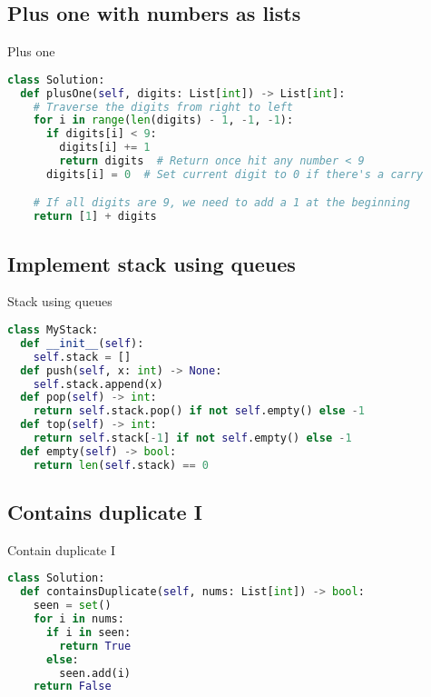 \documentclass[a4paper,12pt]{article}
\begin{document}
\begin{multicols}{2}
\subsection{Plus one with numbers as lists}

\begin{mycode}[label={lst:plus-one}]{Plus one}
\begin{lstlisting}[language=Python]
class Solution:
  def plusOne(self, digits: List[int]) -> List[int]:
    # Traverse the digits from right to left
    for i in range(len(digits) - 1, -1, -1):
      if digits[i] < 9:
        digits[i] += 1
        return digits  # Return once hit any number < 9
      digits[i] = 0  # Set current digit to 0 if there's a carry

    # If all digits are 9, we need to add a 1 at the beginning
    return [1] + digits
\end{lstlisting}
\end{mycode}

\subsection{Implement stack using queues}

\begin{mycode}[label={lst:stack-using-queues}]{Stack using queues}
\begin{lstlisting}[language=Python]
class MyStack:
  def __init__(self):
    self.stack = []    
  def push(self, x: int) -> None:
    self.stack.append(x)
  def pop(self) -> int:
    return self.stack.pop() if not self.empty() else -1
  def top(self) -> int:
    return self.stack[-1] if not self.empty() else -1
  def empty(self) -> bool:
    return len(self.stack) == 0
\end{lstlisting}
\end{mycode}

\subsection{Contains duplicate I}

\begin{mycode}[label={lst:contains-duplicate}]{Contain duplicate I}
\begin{lstlisting}[language=Python]
class Solution:
  def containsDuplicate(self, nums: List[int]) -> bool:
    seen = set()
    for i in nums:
      if i in seen:
        return True
      else:
        seen.add(i)
    return False
\end{lstlisting}
\end{mycode}


\end{multicols}
\end{document}

